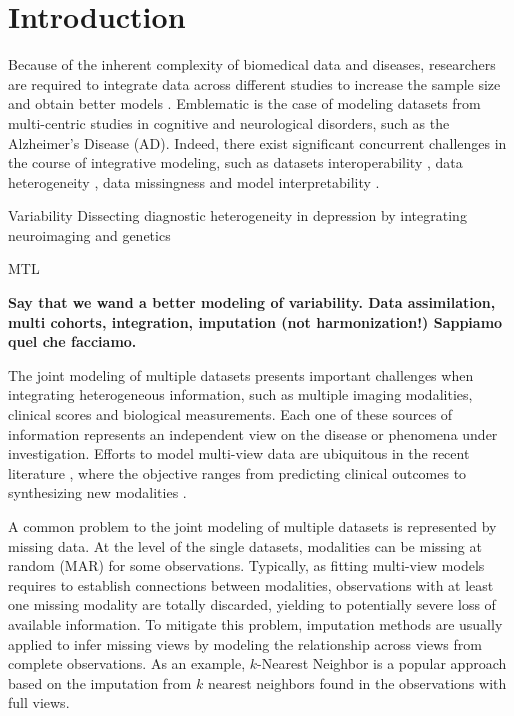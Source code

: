 \section{Introduction}

Because of the inherent complexity of biomedical data and diseases,
researchers are required to integrate data across different studies to increase the sample size and obtain better models \citep{LeSueur2020}.
Emblematic is the case of modeling datasets from multi-centric studies in cognitive and neurological disorders, such as the Alzheimer's Disease (AD).
Indeed, there exist significant concurrent challenges in the course of integrative modeling,
such as datasets interoperability \citep{Tognin2020},
data heterogeneity \citep{Buch2020},
data missingness and model interpretability \citep{GolrizKhatami2020}.

Variability
\citep{Buch2020}
Dissecting diagnostic heterogeneity in depression by integrating neuroimaging and genetics

MTL 


\textbf{
	Say that we wand a better modeling of variability.
Data assimilation, multi cohorts, integration, imputation (not harmonization!)
Sappiamo quel che facciamo.
}

The joint modeling of multiple datasets presents important challenges when integrating heterogeneous information,
such as multiple imaging modalities, clinical scores and biological measurements.
Each one of these sources of information represents an independent view on the disease or phenomena under investigation.
Efforts to model multi-view data are ubiquitous in the recent literature \citep{Vieira2020}, where the objective ranges from predicting clinical outcomes \citep{Chen2019} to synthesizing new modalities \citep{Zhou2020, Wei2019}.

A common problem to the joint modeling of multiple datasets is represented by missing data.
At the level of the single datasets, modalities can be missing at random (MAR) for some observations.
Typically, as fitting multi-view models requires to establish connections between modalities, observations with at least one missing modality are totally discarded, yielding to potentially severe loss of available information.
To mitigate this problem, imputation methods are usually applied to infer missing views by modeling the relationship across views from complete observations.
As an example, $k$-Nearest Neighbor is a popular approach based on the imputation from $k$ nearest neighbors found in the observations with full views.

